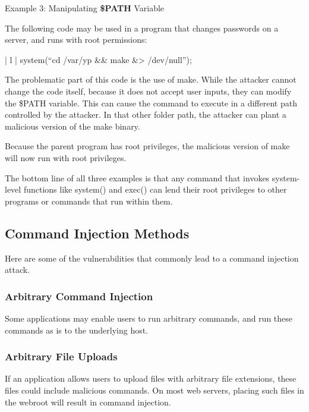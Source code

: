 Example 3: Manipulating \textbf{\$PATH} Variable

The following code may be used in a program that changes passwords on a server, and runs with root permissions:

\begin{table}
\centering

\begin{tabular}{| l |}
\hline
system(“cd /var/yp \&& make \&> /dev/null”); \\
\hline

\end{tabular}

\end{table}

The problematic part of this code is the use of make. While the attacker cannot change the code itself, because it does not accept user inputs, they can modify the \$PATH variable. This can cause the command to execute in a different path controlled by the attacker. In that other folder path, the attacker can plant a malicious version of the make binary.

Because the parent program has root privileges, the malicious version of make will now run with root privileges.

The bottom line of all three examples is that any command that invokes system-level functions like system() and exec() can lend their root privileges to other programs or commands that run within them.

\subsection{Command Injection Methods}

Here are some of the vulnerabilities that commonly lead to a command injection attack.

\subsubsection{Arbitrary Command Injection}

Some applications may enable users to run arbitrary commands, and run these commands as is to the underlying host.

\subsubsection{Arbitrary File Uploads}

If an application allows users to upload files with arbitrary file extensions, these files could include malicious commands. On most web servers, placing such files in the webroot will result in command injection.

